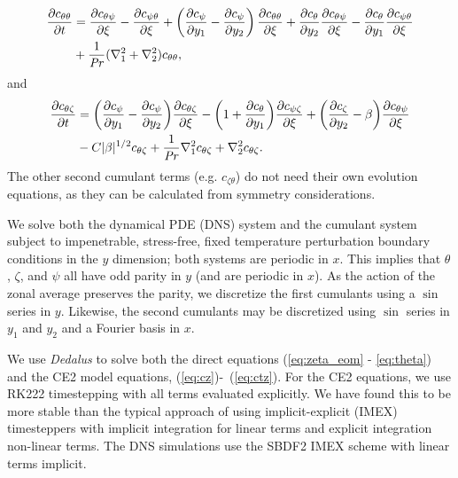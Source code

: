 \documentclass{jfm}
\newcommand{\cz}{c_{\zeta}}
\newcommand{\cs}{c_{\psi}}
\newcommand{\ct}{c_{\theta}}
\newcommand{\csz}{c_{\psi \zeta}}
\newcommand{\ctz}{c_{\theta \zeta}}
\newcommand{\czt}{c_{\zeta \theta}}
\newcommand{\ctt}{c_{\theta \theta}}
\newcommand{\cst}{c_{\psi \theta}}
\newcommand{\cts}{c_{\theta \psi}}
\begin{document}
\begin{equation}
  \label{eq:ctt}
\begin{split}
  \pdv{\ctt}{t} &= \pdv{\cts}{\xi} - \pdv{\cst}{\xi} + \left(\pdv{\cs}{y_1} - \pdv{\cs}{y_2}\right)\pdv{\ctt}{\xi} + \pdv{\ct}{y_2}\pdv{\cts}{\xi} - \pdv{\ct}{y_1}\pdv{\cst}{\xi}\\
&  + \frac{1}{\Pran}(\nabla_1^2 + \nabla_2^2) \ctt,
\end{split}
\end{equation}
and
\begin{equation}
  \label{eq:ctz}
  \begin{split}
    \pdv{\ctz}{t} &= \qty(\pdv{\cs}{y_1} - \pdv{\cs}{y_2}) \pdv{\ctz}{\xi} - \qty(1 + \pdv{\ct}{y_1}) \pdv{\csz}{\xi} + \qty(\pdv{\cz}{y_2} - \beta) \pdv{\cts}{\xi}\\
    &  - C |\beta|^{1/2} \ctz + \frac{1}{\Pran} \nabla_1^2 \ctz + \nabla_2^2 \ctz.
  \end{split}
\end{equation}
The other second cumulant terms (e.g. $\czt$) do not need their own evolution equations, as they can be calculated from symmetry considerations.

We solve both the dynamical PDE (DNS) system and the cumulant system subject to impenetrable, stress-free, fixed temperature perturbation boundary conditions in the $y$ dimension; both systems are periodic in $x$. 
This implies that $\theta$, $\zeta$, and $\psi$ all have odd parity in $y$ (and are periodic in $x$). As
the action of the zonal average preserves the parity, we discretize the first cumulants using a $\sin$ series in $y$. Likewise,
the second cumulants may be discretized using $\sin$ series in $y_1$ and $y_2$ and a Fourier basis in $x$.

We use \emph{Dedalus} \citep{2020PhRvR...2b3068B} to solve both the direct equations (\ref{eq:zeta_eom} - \ref{eq:theta}) and the CE2 model equations, (\ref{eq:cz})-~(\ref{eq:ctz}).
For the CE2 equations, we use RK222 timestepping with all terms evaluated explicitly.
We have found this to be more stable than the typical approach of using implicit-explicit (IMEX) timesteppers with implicit integration for linear terms and explicit integration non-linear terms.
The DNS simulations use the SBDF2 IMEX scheme with linear terms implicit.
\end{document}

